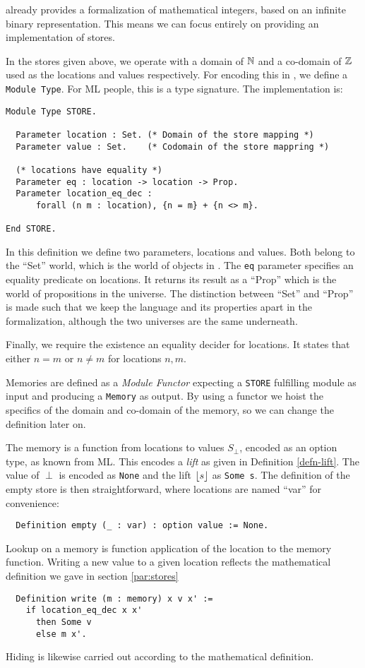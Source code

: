 \coq{} already provides a formalization of mathematical integers,
based on an infinite binary representation. This means we can focus
entirely on providing an implementation of stores.

In the stores given above, we operate with a domain of $\mathbb{N}$ and a
co-domain of $\mathbb{Z}$ used as the locations and values respectively. For
encoding this in \coq{}, we define a \texttt{Module Type}. For ML
people, this is a type signature. The implementation is:
\begin{verbatim}
Module Type STORE.

  Parameter location : Set. (* Domain of the store mapping *)
  Parameter value : Set.    (* Codomain of the store mappring *)

  (* locations have equality *)
  Parameter eq : location -> location -> Prop.
  Parameter location_eq_dec :
      forall (n m : location), {n = m} + {n <> m}.

End STORE.
\end{verbatim}
In this definition we define two parameters, locations and
values. Both belong to the ``Set'' world, which is the world of
objects in \coq{}. The \texttt{eq} parameter specifies an equality
predicate on locations. It returns its result as a ``Prop'' which is
the world of propositions in the universe. The distinction between
``Set'' and ``Prop'' is made such that we keep the language and its
properties apart in the formalization, although the two universes are
the same underneath.

Finally, we require the existence an equality decider for
locations. It states that either $n = m$ or $n \neq m$ for locations
$n, m$.

Memories are defined as a \emph{Module Functor} expecting a
\texttt{STORE} fulfilling module as input and producing a
\texttt{Memory} as output. By using a functor we hoist the specifics
of the domain and co-domain of the memory, so we can change the
definition later on.

The memory is a function from locations to values $S_{\perp}$, encoded
as an option type, as known from ML. This encodes a \emph{lift} as given in
Definition \ref{defn-lift}. The value of $\perp$ is encoded as
\texttt{None} and the lift $\lfloor s \rfloor$ as \texttt{Some s}. The
definition of the empty store is then straightforward, where locations
are named ``var'' for convenience:
\begin{verbatim}
  Definition empty (_ : var) : option value := None.
\end{verbatim}
Lookup on a memory is function application of the location to the
memory function. Writing a new value to a given location reflects the
mathematical definition we gave in section \ref{par:stores}
\begin{verbatim}
  Definition write (m : memory) x v x' :=
    if location_eq_dec x x'
      then Some v
      else m x'.
\end{verbatim}
Hiding is likewise carried out according to the mathematical definition.

